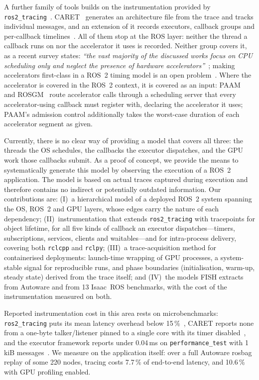 A further family of tools builds on the instrumentation provided by
\texttt{ros2\_tracing}~\cite{bedard-2022-ros2tracing}.
CARET~\cite{kuboichi-2022-caret} generates an architecture file from the trace
and tracks individual messages, and an extension of it records executors,
callback groups and per-callback timelines~\cite{peng-2022-caretcomp}. All of
them stop at the ROS layer: neither the thread a callback runs on nor the
accelerator it uses is recorded. Neither group covers it, as a recent survey
states: \textit{``the vast majority of the discussed works focus on CPU
scheduling only and neglect the presence of hardware
accelerators''}~\cite{casini-2025-surveyros2}; making accelerators first-class
in a ROS~2 timing model is an open
problem~\cite{yano-2026-rightanalyticalmodelsoftware}. Where the accelerator is
covered in the ROS~2 context, it is covered as an input:
PAAM~\cite{enright-2024-paam} and ROSGM~\cite{li-2023-rosgm} route accelerator
calls through a scheduling server that every accelerator-using callback must
register with, declaring the accelerator it uses; PAAM's admission control
additionally takes the worst-case duration of each accelerator segment as given.

Currently, there is no clear way of providing a model that covers all three: the
threads the OS schedules, the callbacks the executor dispatches, and the GPU
work those callbacks submit. As a proof of concept, we provide the means to
systematically generate this model by observing the execution of a ROS~2
application. The model is based on actual traces captured during execution and
therefore contains no indirect or potentially outdated information. Our
contributions are: (I)~a hierarchical model of a deployed ROS~2 system spanning
the OS, ROS~2 and GPU layers, whose edges carry the nature of each dependency;
(II)~instrumentation that extends \texttt{ros2\_tracing} with tracepoints for
object lifetime, for all five kinds of callback an executor dispatches---timers,
subscriptions, services, clients and waitables---and for intra-process delivery,
covering both \texttt{rclcpp} and \texttt{rclpy}; (III)~a trace-acquisition
method for containerised deployments: launch-time wrapping of GPU processes, a
system-stable signal for reproducible runs, and phase boundaries
(initialisation, warm-up, steady state) derived from the trace itself; and
(IV)~the models FISH extracts from Autoware and from 13 Isaac~ROS benchmarks,
with the cost of the instrumentation measured on both.

Reported instrumentation cost in this area rests on microbenchmarks:
\texttt{ros2\_tracing} puts its mean latency overhead below
15\,\%~\cite{casini-2025-surveyros2}, CARET reports none from a one-byte
talker/listener pinned to a single core with its timer
disabled~\cite{kuboichi-2022-caret}, and the executor framework reports under
0.04\,ms on \texttt{performance\_test} with 1\,kiB
messages~\cite{peng-2022-caretcomp}. We measure on the application itself:
over a full Autoware rosbag replay of some 220 nodes, tracing costs 7.7\,\% of
end-to-end latency, and 10.6\,\% with GPU profiling enabled.
